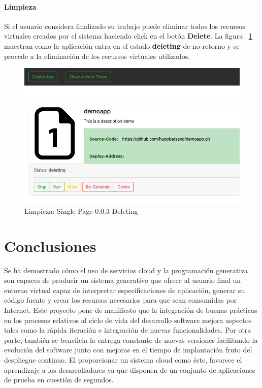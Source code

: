 \documentclass[a4paper,11pt]{book}
\begin{document}
\subsubsection{Limpieza}

Si el usuario considera finalizado su trabajo puede eliminar todos los recursos virtuales creados por el sistema haciendo click en el botón \textbf{Delete}. La figura ~\ref{5_2} muestran como la aplicación entra en el estado \textbf{deleting}  de no retorno y se procede a la eliminación de los recursos virtuales utilizados.   


\begin{figure}[H]
\centering
\includegraphics[scale=0.4]{imagenes/casouso_a/5_2.png}
\caption{  Limpieza: Single-Page 0.0.3 Deleting }
\label{5_2}
\end{figure}



\chapter{Conclusiones}

Se ha demostrado cómo el uso de servicios cloud y la programación generativa son capaces de producir un sistema generativo que ofrece al usuario final un entorno virtual capaz de interpretar especificaciones de aplicación, generar su código fuente y crear los recursos necesarios para que sean consumidas por Internet.   Este proyecto pone de manifiesto que la integración de buenas prácticas en los procesos relativos al ciclo de vida del desarrollo software mejora aspectos tales como la rápida iteración e integración  de nuevas funcionalidades. Por otra parte, también se beneficia la entrega constante de nuevas versiones facilitando la evolución del software junto con mejoras en el tiempo de implantación fruto del despliegue continuo. El proporcionar un sistema cloud como éste, favorece el aprendizaje a los desarrolladores ya que disponen de un conjunto de aplicaciones de prueba en cuestión de segundos.  
\end{document}
